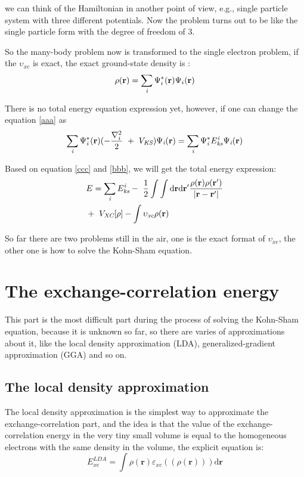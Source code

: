 \documentclass[a4paper]{report}
\begin{document}
\noindent we can think of the Hamiltonian in another point of view, e.g., single particle system with three different potentials. Now the
 problem turns out to be like the single particle form with the degree of freedom of 3.

\noindent So the many-body problem now is transformed to the single electron problem, if the $\upsilon_\textit{xc}$  is exact, the exact ground-state density is :
\begin{equation}\label{ks1}
 \rho(\textbf{r}) = \sumi<i> {\Psi^{*}_{i}(\textbf{r})} {\Psi_{i}(\textbf{r})}
\end{equation}

\noindent There is no total energy equation expression yet, however, if one can change the equation \ref{aaa} as 
\begin{equation}\label{bbb}
\sumi<i> \Psi^{*}_{\textit{i}}(\textbf{r})(-\frac{\nabla^{2}_{i}}{2}\ + \ V_\textit{KS}) \Psi_{\textit{i}}(\textbf{r}) = \sumi<i> \Psi^{*}_{\textit{i}}E_{\textit{ks}}^{\textit{i}} \Psi_{\textit{i}}(\textbf{r})
\end{equation}

\noindent Based on equation \ref{ccc} and \ref{bbb}, we will get the total energy expression:
\begin{equation}\label{totalenergy}
\begin{split}
& E= \sumi<i> E_{\textit{ks}}^{\textit{i}} - \ \frac{1}{2} \int \int \mathrm{d} {\textbf{r}} \mathrm{d}{\textbf{r}^{\prime}} \frac{\rho({\textbf{r}})\rho(\textbf{r}^{\prime})}{|{\textbf{r}}-{\textbf{r}}^{\prime}|} \\
&    + \ V_\textit{XC}[\rho] - \int   \upsilon_\textit{xc} \rho({\textbf{r}})
\end{split}
\end{equation}

\noindent So far there are two problems still in the air, one is the exact format of $\upsilon_\textit{xc}$, the other one is how to solve the Kohn-Sham equation.

\section{The exchange-correlation energy}
\noindent This part is the most difficult part during the process of solving the Kohn-Sham equation, because it is unknown so far, so there
 are varies of approximations about it, like the local density approximation (LDA), generalized-gradient approximation (GGA) and
so on.
\subsection{The local density approximation}
\noindent The local density approximation is the simplest way to approximate the exchange-correlation part, and the idea is that the value 
of the exchange-correlation energy in the very tiny small volume is equal to the homogeneous electrons with the same density in 
the volume, the explicit equation is: 
\begin{equation}
 E^\textit{LDA}_\textit{xc} = \int \rho(\textbf{r}) \varepsilon_\textit{xc}( (\rho(\textbf{r})) ) \mathrm{d} \textbf{r} 
\end{equation}
\end{document}
